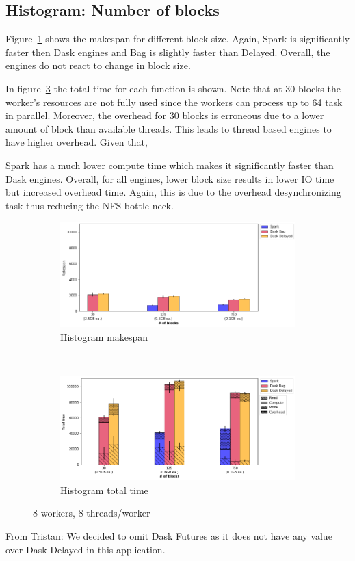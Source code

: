 \documentclass[conference]{IEEEtran}
\newcommand{\TG}[1]{\color{cyan}From Tristan: #1 \color{black}}
\begin{document}
\subsection{Histogram: Number of blocks}
Figure~\ref{fig:histo_ms_block} shows the makespan for different block size.
Again, Spark is significantly faster then Dask engines and Bag is slightly faster
than Delayed. Overall, the engines do not react to change in block size.

In figure~\ref{fig:histo_tt_block} the total time for each function is shown.
Note that at 30 blocks the worker's resources are not fully used since the workers
can process up to 64 task in parallel. Moreover, the overhead for 30 blocks is
erroneous due to a lower amount of block than available threads. This leads to thread
based engines to have higher overhead. Given that, 

Spark has a much lower compute time which makes it significantly faster than Dask
engines. Overall, for all engines, lower block size results in lower IO time but
increased overhead time. Again, this is due to the overhead desynchronizing task thus
reducing the NFS bottle neck.

\begin{figure}[!t]
    \centering
    \begin{subfigure}[b]{\columnwidth}
        \includegraphics[clip,width=\columnwidth]{images/histo_block.png}%
        \caption{Histogram makespan}\label{fig:histo_ms_block}
    \end{subfigure}
    \\
    \begin{subfigure}[b]{\columnwidth}
        \includegraphics[clip,width=\columnwidth]{images/histo_idle_block.png}%
        \caption{Histogram total time}\label{fig:histo_tt_block}
    \end{subfigure}
    \caption{8 workers, 8 threads/worker}
\end{figure}
\TG{We decided to omit Dask Futures as it does not have any value over Dask
Delayed in this application.}
\end{document}
